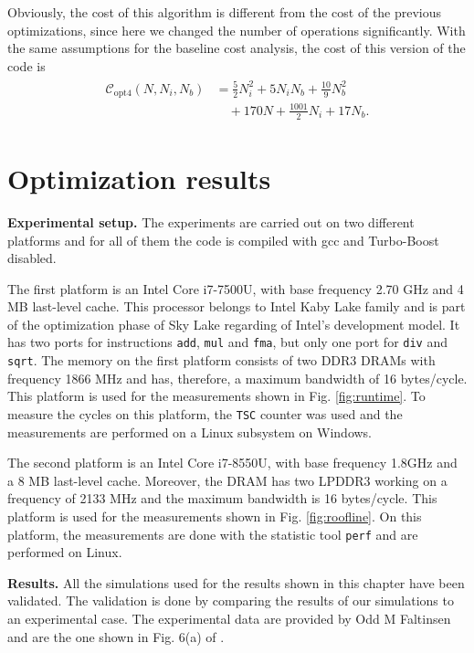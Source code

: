 \documentclass[letterpaper]{article}
\newcommand{\mypar}[1]{{\bf #1.}}
\begin{document}
Obviously, the cost of this algorithm is different from the cost of the previous optimizations, since here we changed the number of operations significantly. With the same assumptions for the baseline cost analysis, the cost of this version of the code is
\begin{align}
    \begin{split}
    \mathcal{C}_{\text{opt4}}(N, N_i, N_b) &= \frac{5}{2}N_i^2 + 5N_i N_b + \frac{10}{9}N_b^2 \\
    &\quad+ 170N + \frac{1001}{2}N_i + 17N_b. 
    \end{split}
\end{align}
\section{Optimization results}\label{sec:results}

\mypar{Experimental setup}
The experiments are carried out on two different platforms and for all of them the code is compiled with gcc and Turbo-Boost disabled.

The first platform is an Intel Core i7-7500U, with base frequency 2.70 GHz and 4 MB last-level cache. This processor belongs to Intel Kaby Lake family and is part of the optimization phase of Sky Lake regarding of Intel's development model. It has two ports for instructions \verb|add|, \verb|mul| and \verb|fma|, but only one port for \verb|div| and \verb|sqrt|. 
The memory on the first platform consists of two DDR3 DRAMs with frequency 1866 MHz and has, therefore, a maximum bandwidth of 16 bytes/cycle. This platform is used for the measurements shown in Fig. \ref{fig:runtime}. To measure the cycles on this platform, the \verb|TSC| counter was used and the measurements are performed on a Linux subsystem on Windows. 

The second platform is an Intel Core i7-8550U, with base frequency 1.8GHz and a 8 MB last-level cache. Moreover, the DRAM has two LPDDR3 working on a frequency of 2133 MHz and the maximum bandwidth is 16 bytes/cycle.
This platform is used for the measurements shown in Fig. \ref{fig:roofline}. On this platform, the measurements are done with the statistic tool \verb|perf| and are performed on Linux.

\mypar{Results}
All the simulations used for the results shown in this chapter have been validated.
The validation is done by comparing the results of our simulations to an experimental case. The experimental data are provided by Odd M Faltinsen and are the one shown in  Fig. 6(a) of \cite{Faltinsen_Rognebakke_Lukovsky_Timokha_2000}.
\end{document}
